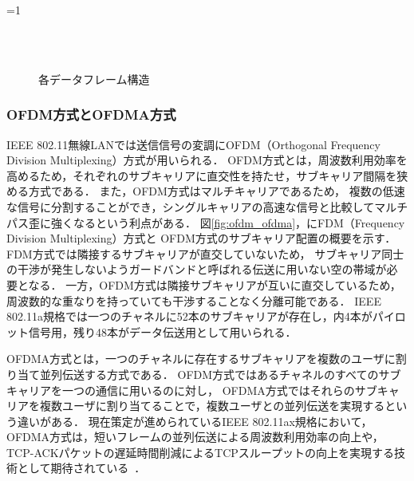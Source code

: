 \documentclass[master]{kuisthesis}		%
\newcounter{flagFig}
\begin{document}
			\ifnum\value{flagFig}=1 {\begin{figure}[htbp]
				\begin{center}
					\\
					\\
					\caption{各データフレーム構造}
					\label{fig:frame}
				\end{center}
			\end{figure}}\fi

		\subsubsection{OFDM方式とOFDMA方式}
			IEEE 802.11無線LANでは送信信号の変調にOFDM（Orthogonal Frequency Division Multiplexing）方式が用いられる．
			OFDM方式とは，周波数利用効率を高めるため，それぞれのサブキャリアに直交性を持たせ，サブキャリア間隔を狭める方式である．
			また，OFDM方式はマルチキャリアであるため，
			複数の低速な信号に分割することができ，シングルキャリアの高速な信号と比較してマルチパス歪に強くなるという利点がある．
			図\ref{fig:ofdm_ofdma}，にFDM（Frequency Division Multiplexing）方式と
			OFDM方式のサブキャリア配置の概要を示す．
			FDM方式では隣接するサブキャリアが直交していないため，
			サブキャリア同士の干渉が発生しないようガードバンドと呼ばれる伝送に用いない空の帯域が必要となる．
			一方，OFDM方式は隣接サブキャリアが互いに直交しているため，周波数的な重なりを持っていても干渉することなく分離可能である．
			IEEE 802.11a規格では一つのチャネルに52本のサブキャリアが存在し，内4本がパイロット信号用，残り48本がデータ伝送用として用いられる．
			\par
			OFDMA方式とは，一つのチャネルに存在するサブキャリアを複数のユーザに割り当て並列伝送する方式である．
			OFDM方式ではあるチャネルのすべてのサブキャリアを一つの通信に用いるのに対し，
			OFDMA方式ではそれらのサブキャリアを複数ユーザに割り当てることで，複数ユーザとの並列伝送を実現するという違いがある．
			現在策定が進められているIEEE 802.11ax規格において，OFDMA方式は，短いフレームの並列伝送による周波数利用効率の向上や，
			TCP-ACKパケットの遅延時間削減によるTCPスループットの向上を実現する技術として期待されている~\cite{ofdma}．
\end{document}
